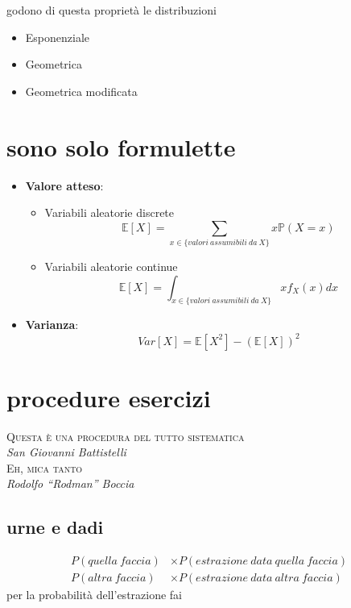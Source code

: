 \documentclass{article}
\begin{document}
godono di questa proprietà le distribuzioni
\begin{itemize}
  \item Esponenziale
  \item Geometrica
  \item Geometrica modificata
\end{itemize}

\section{sono solo formulette}
\begin{itemize}
\item \textbf{Valore atteso}:

  \begin{itemize}
    \item Variabili aleatorie discrete
      \[\mathbb{E}[X] = \sum_{x \in \{valori\ assumibili\ da\ X\}} x \mathbb{P}(X = x) \]
    \item Variabili aleatorie continue
      \[\mathbb{E}[X] = \int_{x \in \{valori\ assumibili\ da\ X\}} x f_X(x) dx \]
  \end{itemize}
\item \textbf{Varianza}:
  \[Var[X] = \mathbb{E}[X^2] - {(\mathbb{E}[X])}^2 \]
\end{itemize}

\section{procedure esercizi}
\begin{flushright}
  \hspace{-2cm}
  \textsc{Questa è una procedura del tutto sistematica} \\
  \textit{San Giovanni Battistelli} \\
  \vspace{0.5cm}
  \textsc{Eh, mica tanto} \\
  \textit{Rodolfo ``Rodman'' Boccia}
\end{flushright}

\subsection{urne e dadi}
\begin{align*}
  P(quella\ faccia) &\times P(estrazione\ data\ quella\ faccia) \\
  P(altra\ faccia) &\times P(estrazione\ data\ altra\ faccia)
\end{align*}
per la probabilità dell'estrazione fai
\end{document}
